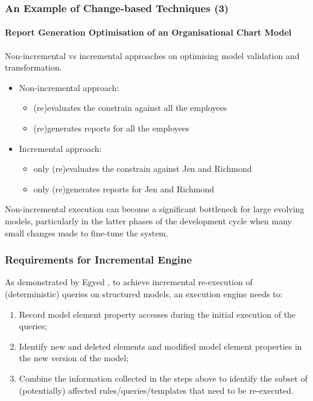 \documentclass{beamer}
\begin{document}
\begin{frame}
\frametitle{An Example of Change-based Techniques (3)}
\label{sec:An example_of_change-based_techniques_3}
\framesubtitle{Report Generation Optimisation of an Organisational Chart Model}
Non-incremental vs incremental approaches on optimising model validation and transformation.
\begin{itemize}
\item Non-incremental approach:
    \begin{itemize}
    \item (re)evaluates the constrain against all the employees
    \item (re)generates reports for all the employees
    \end{itemize}
\item Incremental approach:
    \begin{itemize}
    \item  only (re)evaluates the constrain against Jen and Richmond
    \item only (re)generates reports for Jen and Richmond
    \end{itemize}
\end{itemize}
Non-incremental execution can become a significant bottleneck for large evolving models, particularly in the latter phases of the development cycle when many small changes made to fine-tune the system\cite{selic2003pragmatics}.
\end{frame}

\begin{frame}
\frametitle{Requirements for Incremental Engine}
As demonstrated by Egyed \cite{egyed2011automatically}, to achieve incremental re-execution of (deterministic) queries on structured models, an execution engine needs to:
\begin{enumerate}
\item Record model element property accesses during the initial execution of the queries;
\item Identify new and deleted elements and modified model element properties in the new version of the model;
\item Combine the information collected in the steps above to identify the subset of (potentially) affected rules/queries/templates that need to be re-executed.
\end{enumerate}
\end{frame}
\end{document}
